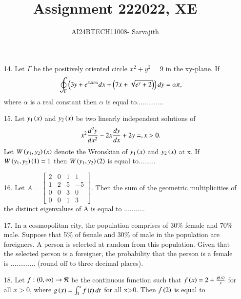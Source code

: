 \documentclass[journal]{IEEEtran}
\begin{document}

\vspace{3cm}


\author{AI24BTECH11008- Sarvajith
}
\title{Assignment 22}
{\let\newpage\relax\maketitle}
\title{2022, XE}
\renewcommand{\thefigure}{\theenumi}
\renewcommand{\thetable}{\theenumi}
\setlength{\intextsep}{10pt} %
\renewcommand{\thetable}{\theenumi}
\begin{enumerate}
    \item[14.] Let $\Gamma$ be the positively oriented circle $x^2 + y^2 = 9$ in the xy-plane. If $$\oint_{\Gamma}\left(3y + e^{xsinx}dx + \left(7x+\sqrt{e^y + 2}\right)\right)dy =\alpha \pi,$$ where $\alpha$ is a real constant then $\alpha$ is equal to..............
    \item[15.] Let $y_1\left(x\right)$ and $y_2\left(x\right)$ be two linearly independent solutions of $$x^2\frac{d^2y}{dx^2}-2x\frac{dy}{dx}+2y=, \hfill x>0.$$ Let $W\left(y_1,y_2\right)\left(x\right)$ denote the Wronskian of $y_1\left(x\right)$ and $y_2\left(x\right)$ at x. If $W\left(y_1, y_2\right)\left(1\right)=1$ then $W\left(y_1, y_2\right)\left(2\right)$ is equal to.........
    \item[16.] Let $A = \begin{bmatrix}2 &0&1&1\\1&2&5&-5\\0&0&3&0\\0&0&1&3\end{bmatrix}$. Then the sum of the geometric multiplicities of the distinct eigenvalues of A is equal to ...........
    \item[17.] In a cosmopolitan city, the population comprises of 30\% female and 70\% male.
    Suppose that 5\% of female and 30\% of male in the population are foreigners. A person is selected at random from this population. Given that the selected person
    is a foreigner, the probability that the person is a female is ............. (round off to
    three decimal places). 
    \item[18.] Let $f:\left(0, \infty\right)\to \mathcal{R}$ be the continuous function such that $f\left(x\right) = 2 + \frac{g\left(x\right)}{x}$ for all $x>0$, where $g\left(x\right)=\int_{1}^{x}f\left(t\right)dt$ for all x>0. Then $f\left(2\right)$ is equal to 

\end{enumerate}
\end{document}
